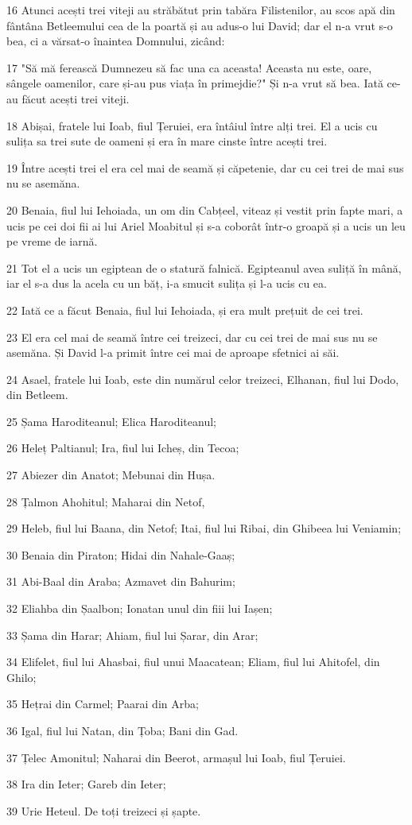 \par 16 Atunci acești trei viteji au străbătut prin tabăra Filistenilor, au scos apă din fântâna Betleemului cea de la poartă și au adus-o lui David; dar el n-a vrut s-o bea, ci a vărsat-o înaintea Domnului, zicând:
\par 17 "Să mă ferească Dumnezeu să fac una ca aceasta! Aceasta nu este, oare, sângele oamenilor, care și-au pus viața în primejdie?" Și n-a vrut să bea. Iată ce-au făcut acești trei viteji.
\par 18 Abișai, fratele lui Ioab, fiul Țeruiei, era întâiul între alți trei. El a ucis cu sulița sa trei sute de oameni și era în mare cinste între acești trei.
\par 19 Între acești trei el era cel mai de seamă și căpetenie, dar cu cei trei de mai sus nu se asemăna.
\par 20 Benaia, fiul lui Iehoiada, un om din Cabțeel, viteaz și vestit prin fapte mari, a ucis pe cei doi fii ai lui Ariel Moabitul și s-a coborât într-o groapă și a ucis un leu pe vreme de iarnă.
\par 21 Tot el a ucis un egiptean de o statură falnică. Egipteanul avea suliță în mână, iar el s-a dus la acela cu un băț, i-a smucit sulița și l-a ucis cu ea.
\par 22 Iată ce a făcut Benaia, fiul lui Iehoiada, și era mult prețuit de cei trei.
\par 23 El era cel mai de seamă între cei treizeci, dar cu cei trei de mai sus nu se asemăna. Și David l-a primit între cei mai de aproape sfetnici ai săi.
\par 24 Asael, fratele lui Ioab, este din numărul celor treizeci, Elhanan, fiul lui Dodo, din Betleem.
\par 25 Șama Haroditeanul; Elica Haroditeanul;
\par 26 Heleț Paltianul; Ira, fiul lui Icheș, din Tecoa;
\par 27 Abiezer din Anatot; Mebunai din Hușa.
\par 28 Țalmon Ahohitul; Maharai din Netof,
\par 29 Heleb, fiul lui Baana, din Netof; Itai, fiul lui Ribai, din Ghibeea lui Veniamin;
\par 30 Benaia din Piraton; Hidai din Nahale-Gaaș;
\par 31 Abi-Baal din Araba; Azmavet din Bahurim;
\par 32 Eliahba din Șaalbon; Ionatan unul din fiii lui Iașen;
\par 33 Șama din Harar; Ahiam, fiul lui Șarar, din Arar;
\par 34 Elifelet, fiul lui Ahasbai, fiul unui Maacatean; Eliam, fiul lui Ahitofel, din Ghilo;
\par 35 Hețrai din Carmel; Paarai din Arba;
\par 36 Igal, fiul lui Natan, din Țoba; Bani din Gad.
\par 37 Țelec Amonitul; Naharai din Beerot, armașul lui Ioab, fiul Țeruiei.
\par 38 Ira din Ieter; Gareb din Ieter;
\par 39 Urie Heteul. De toți treizeci și șapte.

